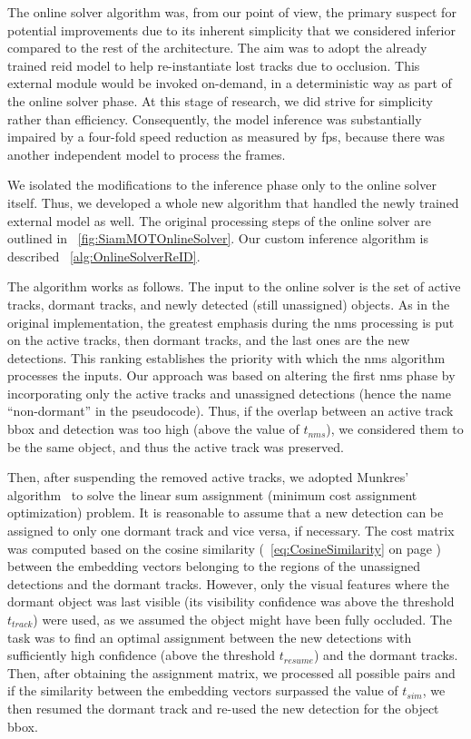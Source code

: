 The online solver algorithm was, from our point of view, the primary suspect for potential improvements due to its inherent simplicity that we considered inferior compared to the rest of the architecture. The aim was to adopt the already trained \gls{reid} model to help re-instantiate lost tracks due to occlusion. This external module would be invoked on-demand, in a deterministic way as part of the online solver phase. At this stage of research, we did strive for simplicity rather than efficiency. Consequently, the model inference was substantially impaired by a four-fold speed reduction as measured by \gls{fps}, because there was another independent model to process the frames.

We isolated the modifications to the inference phase only to the online solver itself. Thus, we developed a whole new algorithm that handled the newly trained external model as well. The original processing steps of the online solver are outlined in \figtext{}~\ref{fig:SiamMOTOnlineSolver}. Our custom inference algorithm is described \algtext{}~\ref{alg:OnlineSolverReID}.

The algorithm works as follows. The input to the online solver is the set of active tracks, dormant tracks, and newly detected (still unassigned) objects. As in the original implementation, the greatest emphasis during the \gls{nms} processing is put on the active tracks, then dormant tracks, and the last ones are the new detections. This ranking establishes the priority with which the \gls{nms} algorithm processes the inputs. Our approach was based on altering the first \gls{nms} phase by incorporating only the active tracks and unassigned detections (hence the name ``non-dormant'' in the pseudocode). Thus, if the overlap between an active track \gls{bbox} and detection was too high (above the value of $t_{nms}$), we considered them to be the same object, and thus the active track was preserved.

Then, after suspending the removed active tracks, we adopted Munkres' algorithm~\cite{munkres1957assignment} to solve the linear sum assignment (minimum cost assignment optimization) problem. It is reasonable to assume that a new detection can be assigned to only one dormant track and vice versa, if necessary. The cost matrix was computed based on the cosine similarity (\eqtext{}~\ref{eq:CosineSimilarity} on page \pageref{eq:CosineSimilarity}) between the embedding vectors belonging to the regions of the unassigned detections and the dormant tracks. However, only the visual features where the dormant object was last visible (its visibility confidence was above the threshold $t_{track}$) were used, as we assumed the object might have been fully occluded. The task was to find an optimal assignment between the new detections with sufficiently high confidence (above the threshold $t_{resume}$) and the dormant tracks. Then, after obtaining the assignment matrix, we processed all possible pairs and if the similarity between the embedding vectors surpassed the value of $t_{sim}$, we then resumed the dormant track and re-used the new detection for the object \gls{bbox}.


